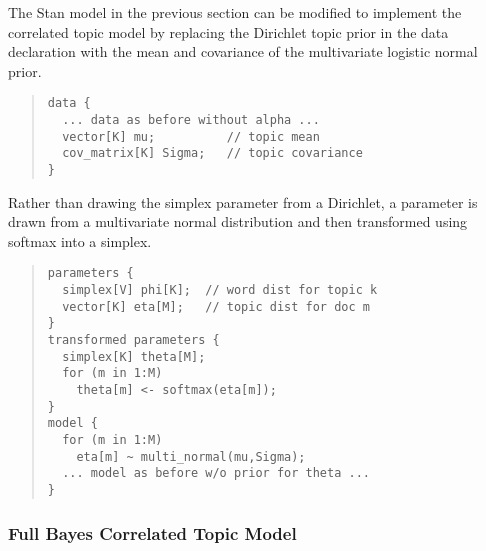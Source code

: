 The Stan model in the previous section can be modified to implement
the correlated topic model by replacing the Dirichlet topic prior
 in the data declaration with the mean and covariance of
the multivariate logistic normal prior.
%
\begin{quote}
\begin{Verbatim}[fontsize=\small]
data {
  ... data as before without alpha ...
  vector[K] mu;          // topic mean
  cov_matrix[K] Sigma;   // topic covariance 
}
\end{Verbatim}
\end{quote}
%
Rather than drawing the simplex parameter  from a
Dirichlet, a parameter  is drawn from a multivariate normal
distribution and then transformed using softmax into a simplex.
%
\begin{quote}
\begin{Verbatim}[fontsize=\small]
parameters {
  simplex[V] phi[K];  // word dist for topic k
  vector[K] eta[M];   // topic dist for doc m
}
transformed parameters {
  simplex[K] theta[M];
  for (m in 1:M)
    theta[m] <- softmax(eta[m]);
}
model {
  for (m in 1:M)
    eta[m] ~ multi_normal(mu,Sigma);
  ... model as before w/o prior for theta ...
}
\end{Verbatim}
\end{quote}

\subsubsection{Full Bayes Correlated Topic Model}

